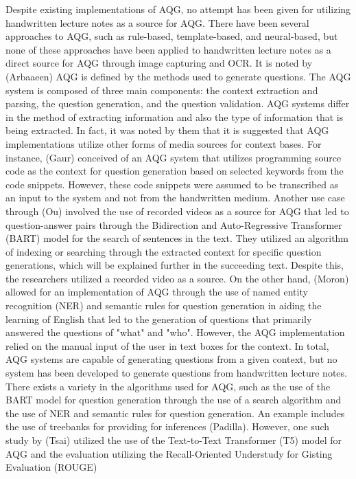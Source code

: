 \documentclass[conference]{IEEEtran}
\begin{document}
Despite existing implementations of AQG, no attempt has been given for utilizing 
handwritten lecture notes as a source for AQG. There have been several
approaches to AQG, such as rule-based, template-based, and neural-based,
but none of these approaches have been applied to handwritten lecture notes as 
a direct source for AQG through image capturing and OCR. It is noted by (Arbaaeen) AQG is defined by the methods used to generate questions.
The AQG system is composed of three main components: the context extraction and
parsing, the question generation, and the question validation. AQG systems differ in the method of extracting information and also 
the type of information that is being extracted. In fact, it was noted by them 
that it is suggested that AQG implementations utilize other forms of media 
sources for context bases. For instance, (Gaur) conceived 
of an AQG system that utilizes programming source code as the context for question
generation based on selected keywords from the code snippets. However, these 
code snippets were assumed to be transcribed as an input to the system and not 
from the handwritten medium. Another use case
through (Ou) involved the use of recorded videos as a source for AQG 
that led to question-answer pairs through the 
Bidirection and Auto-Regressive Transformer (BART) model for
the search of sentences in the text. They utilized an algorithm of indexing or 
searching through the extracted context for specific question generations, which 
will be explained further in the succeeding text. Despite this, the researchers utilized 
a recorded video as a source. On the other hand, (Moron) 
allowed for an implementation of AQG through the use of named entity recognition 
(NER) and semantic rules for question generation in aiding the learning of 
English that led to the generation of questions that primarily answered the
questions of "what" and "who". However, the AQG implementation relied on the 
manual input of the user in text boxes for the context. In total, AQG systems 
are capable of generating questions from a given context, but no system has been
developed to generate questions from handwritten lecture notes.
There exists a variety in the algorithms used for AQG, such as the use of 
the BART model for question generation through the use of a search algorithm and 
the use of NER and semantic rules for question generation. An example includes 
the use of treebanks for providing for inferences (Padilla). However, one such study
by (Tsai) utilized the use of the Text-to-Text Transformer (T5) model for AQG and
the evaluation utilizing the Recall-Oriented Understudy for Gisting Evaluation (ROUGE)
\end{document}
